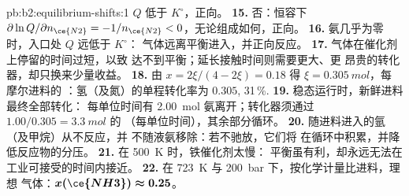 \begin{solution}{pb:b2:equilibrium-shifts:1}
$Q$ 低于 $K^\circ$，正向。
\textbf{15.} 否：恒容下 $\partial\ln Q/\partial n_{\ce{N2}} =
-1/n_{\ce{N2}} < 0$，无论组成如何，正向。
\textbf{16.} 氨几乎为零时，入口处 $Q$ 远低于 $K^\circ$：
气体远离平衡进入，并正向反应。
\textbf{17.} 气体在催化剂上停留的时间过短，以致
达不到平衡；延长接触时间则需要更大、更
昂贵的转化器，却只换来少量收益。
\textbf{18.} 由 $x = 2\xi/(4 - 2\xi) = 0.18$ 得 $\xi = \qty{0.305}{mol}$，每
摩尔进料的 ：氢（及氮）的单程转化率为
$0.305$, 31\,\%.
\textbf{19.} 稳态运行时，新鲜进料最终全部转化：
每单位时间有 \qty{2.00}{mol} 氨离开；转化器须通过 $1.00/
0.305 = \qty{3.3}{mol}$ 的 （每单位时间），其余部分循环。
\textbf{20.} 随进料进入的氩（及甲烷）从不反应，并
不随液氨移除：若不驰放，它们将
在循环中积累，并降低反应物的分压。
\textbf{21.} 在 \qty{500}{K} 时，铁催化剂太慢：
平衡虽有利，却永远无法在工业可接受的时间内接近。
\textbf{22.} 在 \qty{723}{K} 与 \qty{200}{bar} 下，按化学计量比进料，理想
气体：$\boldsymbol{x(\ce{NH3}) \approx 0.25}$。
\end{solution}
